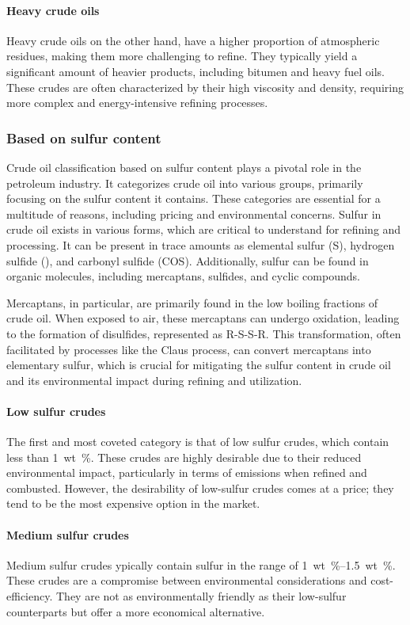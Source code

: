 \paragraph{Heavy crude oils} Heavy crude oils on the other hand, have a higher proportion of atmospheric residues, making them more challenging to refine.
They typically yield a significant amount of heavier products, including bitumen and heavy fuel oils.
These crudes are often characterized by their high viscosity and density, requiring more complex and energy-intensive refining processes.

\subsubsection{Based on sulfur content}
Crude oil classification based on sulfur content plays a pivotal role in the petroleum industry.
It categorizes crude oil into various groups, primarily focusing on the sulfur content it contains.
These categories are essential for a multitude of reasons, including pricing and environmental concerns.
Sulfur in crude oil exists in various forms, which are critical to understand for refining and processing.
It can be present in trace amounts as elemental sulfur (S), hydrogen sulfide (), and carbonyl sulfide (COS).
Additionally, sulfur can be found in organic molecules, including mercaptans, sulfides, and cyclic compounds.

Mercaptans, in particular, are primarily found in the low boiling fractions of crude oil.
When exposed to air, these mercaptans can undergo oxidation, leading to the formation of disulfides, represented as R-S-S-R.
This transformation, often facilitated by processes like the Claus process, can convert mercaptans into elementary sulfur,
which is crucial for mitigating the sulfur content in crude oil and its environmental impact during refining and utilization.

\paragraph{Low sulfur crudes}
The first and most coveted category is that of low sulfur crudes, which contain less than \SI{1}{wt\%}.
These crudes are highly desirable due to their reduced environmental impact, particularly in terms of emissions when refined and combusted.
However, the desirability of low-sulfur crudes comes at a price; they tend to be the most expensive option in the market.

\paragraph{Medium sulfur crudes}
Medium sulfur crudes ypically contain sulfur in the range of \SIrange{1}{1.5}{wt\%}.
These crudes are a compromise between environmental considerations and cost-efficiency.
They are not as environmentally friendly as their low-sulfur counterparts but offer a more economical alternative.

